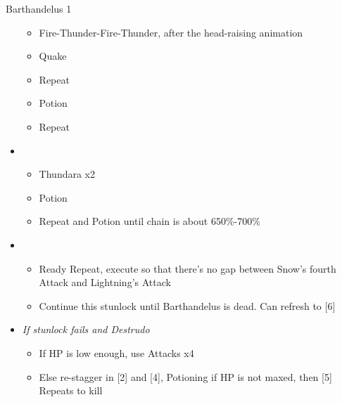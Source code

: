 \begin{battle}{Barthandelus 1}
\begin{itemize}
    \begin{itemize}
        \item Fire-Thunder-Fire-Thunder, after the head-raising animation
        \item Quake
        \item Repeat
        \item Potion
        \item Repeat
    \end{itemize}
    \item \fourth
    \begin{itemize}
        \item Thundara x2
        \item Potion
        \item Repeat and Potion until chain is about 650\%-700\%
    \end{itemize}
    \item \fifth
    \begin{itemize}
        \item Ready Repeat, execute so that there's no gap between Snow's fourth Attack and Lightning's Attack
        \item Continue this stunlock until Barthandelus is dead. Can refresh to [6]
    \end{itemize}
    \item \textit{If stunlock fails and Destrudo}
    \begin{itemize}
        \item If HP is low enough, use Attacks x4
        \item Else re-stagger in [2] and [4], Potioning if HP is not maxed, then [5] Repeats to kill
    \end{itemize}
\end{itemize}
\end{battle}
